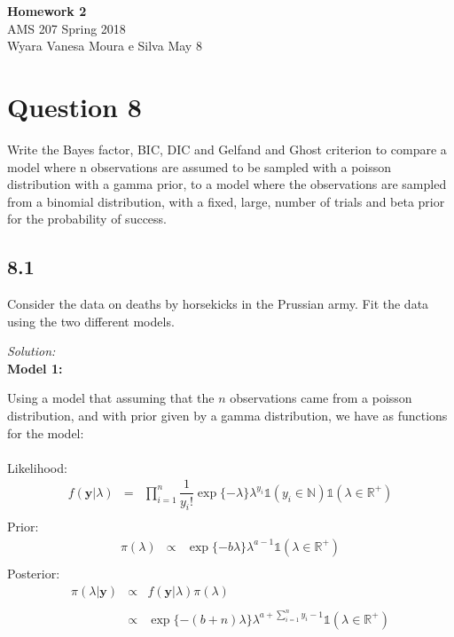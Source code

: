 \documentclass[a4paper, 11pt]{article}
\begin{document}
\noindent
{\Large\textbf{Homework 2} \hfill \\
AMS 207 \hfill Spring 2018 \\
Wyara Vanesa Moura e Silva \hfill May 8\\}

\section*{Question 8}

Write the Bayes factor, BIC, DIC and Gelfand and Ghost criterion to compare a model where n observations are assumed to be sampled with a poisson distribution with a gamma prior, to a model where the observations are sampled from a binomial distribution, with a fixed, large, number of trials and beta prior for the probability of success.

\subsection*{8.1} Consider the data on deaths by horsekicks in the Prussian army. Fit the data using the two different models.

\noindent
\textit{Solution:}\\

\noindent
\textbf{Model 1: }

Using a model that assuming that the $n$ observations came from a poisson distribution, and with prior given by a gamma distribution, we have as functions for the model:\\ \\

\noindent
Likelihood:
\begin{equation*}
\begin{array}{lclll}
f(\textbf{y}|\lambda) & = & \displaystyle\prod_{i=1}^{n} \dfrac{1}{y_i !} \exp\{ -\lambda\}\lambda^{y_i} \mathds{1} \left( y_i\in \mathds{N}\right) \mathds{1} \left(\lambda \in \mathds{R}^+\right) \\
\end{array}
\end{equation*}
Prior:
\begin{equation*}
\begin{array}{lclll}
\pi(\lambda) & \propto & \exp\{ -b\lambda\}\lambda^{a -1} \mathds{1} \left(\lambda \in \mathds{R}^+\right) \\
\end{array}
\end{equation*}
Posterior:
\begin{equation*}
\begin{array}{lclll}
\pi(\lambda|\textbf{y}) & \propto & f(\textbf{y}|\lambda) \pi(\lambda)
\\ \\
 & \propto & \exp\{ -(b + n)\lambda\}\lambda^{a + \sum_{i=1}^{n}y_i -1} \mathds{1} \left(\lambda \in \mathds{R}^+\right) \\ \\
\end{array}
\end{equation*}
\end{document}
